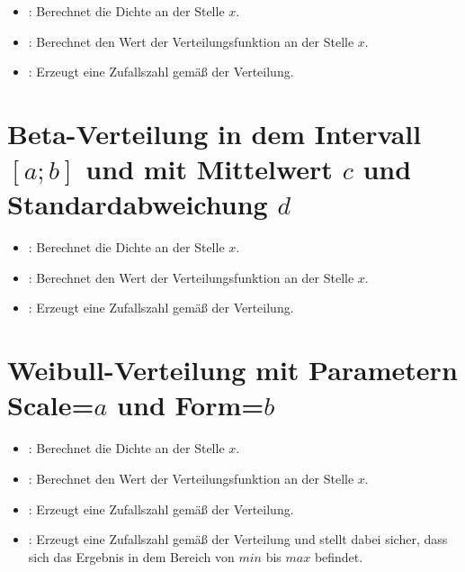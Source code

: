 \begin{itemize}

\item
{}:
Berechnet die Dichte an der Stelle $x$.

\item
{}:
Berechnet den Wert der Verteilungsfunktion an der Stelle $x$.

\item
{}:
Erzeugt eine Zufallszahl gemäß der Verteilung.

\end{itemize}



\section{Beta-Verteilung in dem Intervall \texorpdfstring{$[a;b]$}{[a;b]} und mit Mittelwert \texorpdfstring{$c$}{c} und Standardabweichung \texorpdfstring{$d$}{d}}

\begin{itemize}

\item
{}:
Berechnet die Dichte an der Stelle $x$.

\item
{}:
Berechnet den Wert der Verteilungsfunktion an der Stelle $x$.

\item
{}:
Erzeugt eine Zufallszahl gemäß der Verteilung.

\end{itemize}



\section{Weibull-Verteilung mit Parametern Scale=\texorpdfstring{$a$}{a} und Form=\texorpdfstring{$b$}{b}}

\begin{itemize}

\item
{}:
Berechnet die Dichte an der Stelle $x$.

\item
{}:
Berechnet den Wert der Verteilungsfunktion an der Stelle $x$.

\item
{}:
Erzeugt eine Zufallszahl gemäß der Verteilung.

\item
{}:
Erzeugt eine Zufallszahl gemäß der Verteilung und stellt dabei sicher, dass sich das Ergebnis in dem Bereich von $min$ bis $max$ befindet.

\end{itemize}



